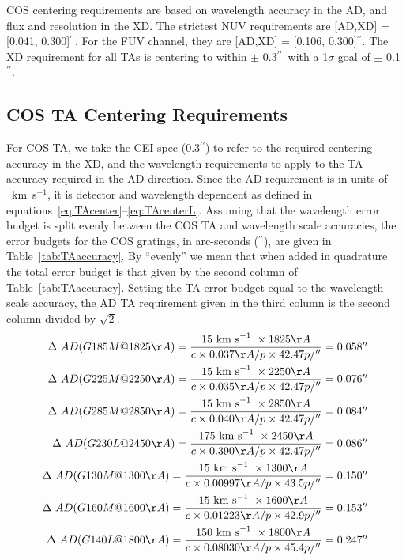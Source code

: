 \documentclass{stsci_report}
\def\arcsec{\hbox{$^{\prime\prime}$}}
\newcommand{\nokmsno}{{\rm km~s}\ensuremath{^{-1}}}
\newcommand{\kmsno}{~\nokmsno}
\newcommand{\kms}{~\nokmsno\ }
\begin{document}
COS centering requirements are based on wavelength accuracy in the AD, and flux and resolution in the XD. The strictest NUV requirements are [AD,XD] = [0.041, 0.300]\arcsec. For the FUV channel, they are [AD,XD] = [0.106, 0.300]\arcsec. The XD requirement for all TAs is centering to within $\pm$ 0.3\arcsec\ with a 1$\sigma$ goal of $\pm$ 0.1\arcsec.

\subsection{COS TA Centering Requirements}\label{subsec:requirements}

For COS TA, we take the CEI spec (0.3\arcsec) to refer to the required centering accuracy in the XD, and the wavelength requirements to apply to
the TA accuracy required in the AD direction. Since the AD requirement is in units of \kmsno, it is detector and wavelength
dependent as defined in equations~\ref{eq:TAcenter}--\ref{eq:TAcenterL}.
Assuming that the wavelength error budget is split evenly between the COS TA and wavelength scale accuracies,
the error budgets for the COS gratings, in arc-seconds (\arcsec), are given in Table~\ref{tab:TAaccuracy}. By ``evenly'' we mean that when added in quadrature the total error budget is that given by the second column of Table~\ref{tab:TAaccuracy}.
Setting the TA error budget equal to the wavelength scale accuracy, the AD TA requirement given in the third column is the second column divided by $\sqrt{2}$.
\small
\begin{eqnarray}\label{eq:TAcenter}
\Delta\ AD(G185M@1825\AA) = {{ 15\kms \times 1825\AA}\over{c \times 0 .037\AA/p\times 42.47 p/\arcsec}}  = 0.058\arcsec\\
\Delta\ AD(G225M@2250\AA) = {{ 15\kms \times 2250\AA}\over{c \times  0.035\AA/p\times 42.47 p/\arcsec}}  = 0.076\arcsec\\
\Delta\ AD(G285M@2850\AA) = {{ 15\kms \times 2850\AA}\over{c \times  0.040\AA/p\times 42.47 p/\arcsec}}  = 0.084\arcsec\\
\Delta\ AD(G230L@2450\AA) = {{175\kms \times 2450\AA}\over{c \times  0.390\AA/p\times 42.47 p/\arcsec}}  = 0.086\arcsec\\
\Delta\ AD(G130M@1300\AA) = {{ 15\kms \times 1300\AA}\over{c \times 0.00997\AA/ p\times 43.5 p/\arcsec}} = 0.150\arcsec\\
\Delta\ AD(G160M@1600\AA) = {{ 15\kms \times 1600\AA}\over{c \times 0.01223\AA/ p\times 42.9 p/\arcsec}} = 0.153\arcsec\\
\Delta\ AD(G140L@1800\AA) = {{150\kms \times 1800\AA}\over{c \times 0.08030\AA/ p\times 45.4 p/\arcsec}} = 0.247\arcsec\label{eq:TAcenterL}
\end{eqnarray}
\normalsize
\clearpage
\end{document}
